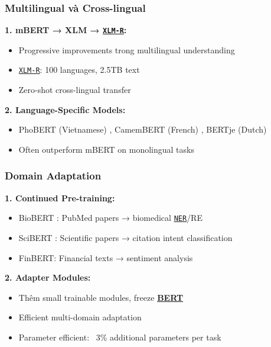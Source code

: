     \subsubsection{Multilingual và Cross-lingual}
    
    \textbf{1. mBERT → XLM \cite{conneau2019unsupervised} → \hyperref[acro:xlm-r]{\texttt{XLM-R}}:}
    \begin{itemize}
        \item Progressive improvements trong multilingual understanding
        \item \hyperref[acro:xlm-r]{\texttt{XLM-R}}: 100 languages, 2.5TB text
        \item Zero-shot cross-lingual transfer
    \end{itemize}
    
    \textbf{2. Language-Specific Models:}
    \begin{itemize}
        \item PhoBERT (Vietnamese) \cite{nguyen2020phobert}, CamemBERT (French) \cite{martin2019camembert}, BERTje (Dutch)
        \item Often outperform mBERT on monolingual tasks
    \end{itemize}
    
    \subsubsection{Domain Adaptation}
    
    \textbf{1. Continued Pre-training:}
    \begin{itemize}
        \item BioBERT \cite{lee2020biobert}: PubMed papers → biomedical \hyperref[acro:ner]{\texttt{NER}}/RE
        \item SciBERT \cite{beltagy2019scibert}: Scientific papers → citation intent classification
        \item FinBERT: Financial texts → sentiment analysis
    \end{itemize}
    
    \textbf{2. Adapter Modules:}
    \begin{itemize}
        \item Thêm small trainable modules, freeze \hyperref[acro:bert]{\textbf{BERT}}
        \item Efficient multi-domain adaptation
        \item Parameter efficient: ~3\% additional parameters per task
    \end{itemize}
    
